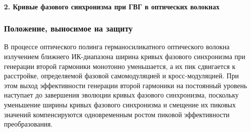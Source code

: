 \begin{frame}
	\justifying 
	\framesubtitle{2. Кривые фазового синхронизма при ГВГ в оптических волокнах}
	\frametitle{Положение, выносимое на защиту}
	
	\large
	
	В процессе оптического полинга германосиликатного оптического волокна излучением ближнего ИК-диапазона ширина кривых фазового синхронизма при генерации второй гармоники монотонно уменьшается, а их пик сдвигается к расстройке, определяемой фазовой самомодуляцией и кросс-модуляцией. При этом выход эффективности генерации второй гармоники на постоянный уровень наступает до завершения эволюции кривых фазового синхронизма, поскольку уменьшение ширины кривых фазового синхронизма и смещение их пиковых значений компенсируются одновременным ростом пиковой эффективности преобразования.
\end{frame}

